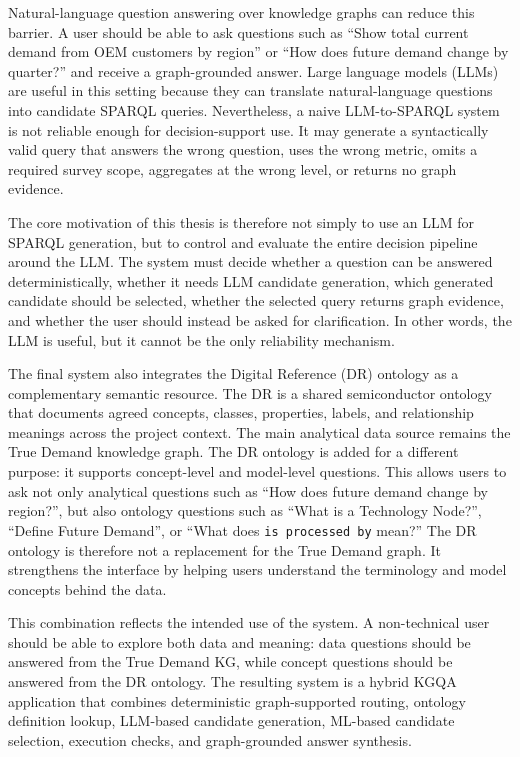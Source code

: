 \documentclass[
  12pt,
  english,
  oneside]{report}
\begin{document}
Natural-language question answering over knowledge graphs can reduce this barrier. A user should be able to ask questions such as ``Show total current demand from OEM customers by region'' or ``How does future demand change by quarter?'' and receive a graph-grounded answer. Large language models (LLMs) are useful in this setting because they can translate natural-language questions into candidate SPARQL queries. Nevertheless, a naive LLM-to-SPARQL system is not reliable enough for decision-support use. It may generate a syntactically valid query that answers the wrong question, uses the wrong metric, omits a required survey scope, aggregates at the wrong level, or returns no graph evidence.

The core motivation of this thesis is therefore not simply to use an LLM for SPARQL generation, but to control and evaluate the entire decision pipeline around the LLM. The system must decide whether a question can be answered deterministically, whether it needs LLM candidate generation, which generated candidate should be selected, whether the selected query returns graph evidence, and whether the user should instead be asked for clarification. In other words, the LLM is useful, but it cannot be the only reliability mechanism.

The final system also integrates the Digital Reference (DR) ontology as a complementary semantic resource. The DR is a shared semiconductor ontology that documents agreed concepts, classes, properties, labels, and relationship meanings across the project context. The main analytical data source remains the True Demand knowledge graph. The DR ontology is added for a different purpose: it supports concept-level and model-level questions. This allows users to ask not only analytical questions such as ``How does future demand change by region?'', but also ontology questions such as ``What is a Technology Node?'', ``Define Future Demand'', or ``What does \texttt{is processed by} mean?'' The DR ontology is therefore not a replacement for the True Demand graph. It strengthens the interface by helping users understand the terminology and model concepts behind the data.

This combination reflects the intended use of the system. A non-technical user should be able to explore both data and meaning: data questions should be answered from the True Demand KG, while concept questions should be answered from the DR ontology. The resulting system is a hybrid KGQA application that combines deterministic graph-supported routing, ontology definition lookup, LLM-based candidate generation, ML-based candidate selection, execution checks, and graph-grounded answer synthesis.
\end{document}
